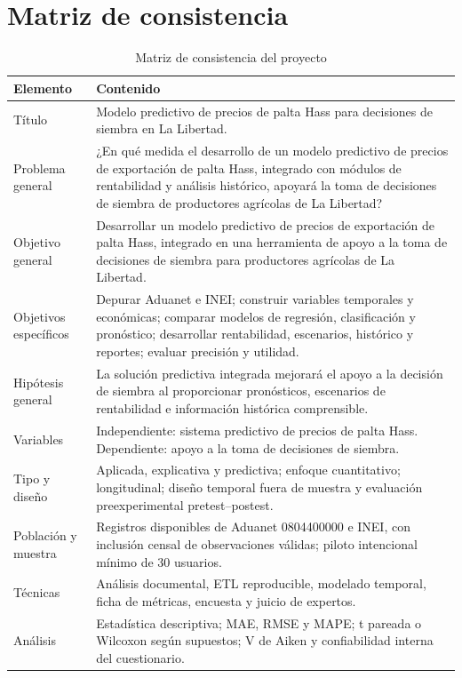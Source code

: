 \chapter{Matriz de consistencia}

\begin{table}[H]
\centering
\caption{Matriz de consistencia del proyecto}
\label{tab:anexo_consistencia}
\scriptsize
\begin{tabularx}{\textwidth}{p{2.4cm}X}
\toprule
\textbf{Elemento} & \textbf{Contenido} \\
\midrule
Título & Modelo predictivo de precios de palta Hass para decisiones de siembra en La Libertad. \\
\midrule
Problema general & ¿En qué medida el desarrollo de un modelo predictivo de precios de exportación de palta Hass, integrado con módulos de rentabilidad y análisis histórico, apoyará la toma de decisiones de siembra de productores agrícolas de La Libertad? \\
\midrule
Objetivo general & Desarrollar un modelo predictivo de precios de exportación de palta Hass, integrado en una herramienta de apoyo a la toma de decisiones de siembra para productores agrícolas de La Libertad. \\
\midrule
Objetivos específicos & Depurar Aduanet e INEI; construir variables temporales y económicas; comparar modelos de regresión, clasificación y pronóstico; desarrollar rentabilidad, escenarios, histórico y reportes; evaluar precisión y utilidad. \\
\midrule
Hipótesis general & La solución predictiva integrada mejorará el apoyo a la decisión de siembra al proporcionar pronósticos, escenarios de rentabilidad e información histórica comprensible. \\
\midrule
Variables & Independiente: sistema predictivo de precios de palta Hass. Dependiente: apoyo a la toma de decisiones de siembra. \\
\midrule
Tipo y diseño & Aplicada, explicativa y predictiva; enfoque cuantitativo; longitudinal; diseño temporal fuera de muestra y evaluación preexperimental pretest--postest. \\
\midrule
Población y muestra & Registros disponibles de Aduanet 0804400000 e INEI, con inclusión censal de observaciones válidas; piloto intencional mínimo de 30 usuarios. \\
\midrule
Técnicas & Análisis documental, ETL reproducible, modelado temporal, ficha de métricas, encuesta y juicio de expertos. \\
\midrule
Análisis & Estadística descriptiva; MAE, RMSE y MAPE; t pareada o Wilcoxon según supuestos; V de Aiken y confiabilidad interna del cuestionario. \\
\bottomrule
\end{tabularx}
\end{table}
